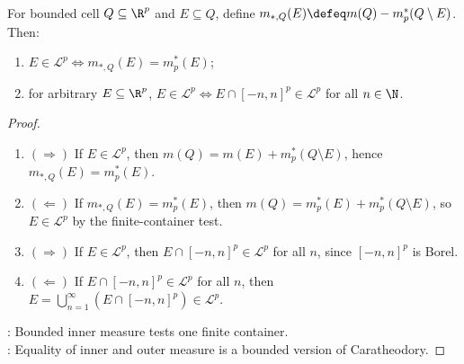 \begin{corollary} \label{cor:bounded-inner-measure-test} \\
For bounded cell $Q\subseteq\R^p$ and $E\subseteq Q$, define $m_{*,Q}(E)\defeq m(Q)-m_p^\ast(Q\setminus E)$. Then:
\begin{enumerate}[label=(\roman*)]
\setlength{\itemsep}{0pt}
\item $E\in\mathcal{L}^p\Longleftrightarrow m_{*,Q}(E)=m_p^\ast(E)$;
\item for arbitrary $E\subseteq\R^p$, $E\in\mathcal{L}^p\Longleftrightarrow E\cap[-n,n]^p\in\mathcal{L}^p$ for all $n\in\N$.
\end{enumerate}
\begin{proof}
\begin{enumerate}[label=\roman*.]
\setlength{\itemsep}{0pt}
\item[$(i)$]$(\Rightarrow)$ If $E\in\mathcal{L}^p$, then $m(Q)=m(E)+m_p^\ast(Q\setminus E)$, hence $m_{*,Q}(E)=m_p^\ast(E)$.
\item[$(i)$]$(\Leftarrow)$ If $m_{*,Q}(E)=m_p^\ast(E)$, then $m(Q)=m_p^\ast(E)+m_p^\ast(Q\setminus E)$, so $E\in\mathcal{L}^p$ by the finite-container test.
\item[$(ii)$]$(\Rightarrow)$ If $E\in\mathcal{L}^p$, then $E\cap[-n,n]^p\in\mathcal{L}^p$ for all $n$, since $[-n,n]^p$ is Borel.
\item[$(ii)$]$(\Leftarrow)$ If $E\cap[-n,n]^p\in\mathcal{L}^p$ for all $n$, then $E=\bigcup_{n=1}^{\infty}(E\cap[-n,n]^p)\in\mathcal{L}^p$.
\end{enumerate}
: Bounded inner measure tests one finite container.\\
: Equality of inner and outer measure is a bounded version of Caratheodory.
\end{proof}
\end{corollary}

